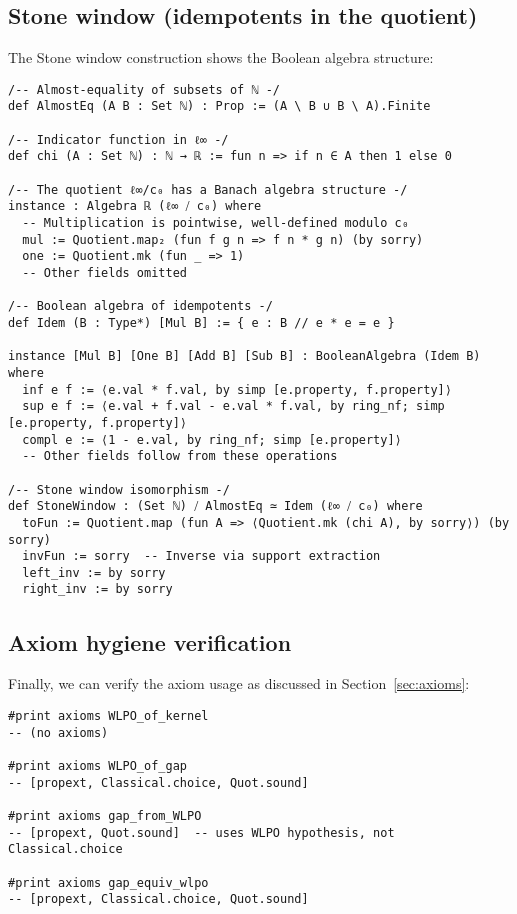 \documentclass[11pt]{article}
\begin{document}
\subsection{Stone window (idempotents in the quotient)}

The Stone window construction shows the Boolean algebra structure:

\begin{lstlisting}[caption={Stone window: Boolean algebra of idempotents},label={lst:stone}]
/-- Almost-equality of subsets of ℕ -/
def AlmostEq (A B : Set ℕ) : Prop := (A \ B ∪ B \ A).Finite

/-- Indicator function in ℓ∞ -/
def chi (A : Set ℕ) : ℕ → ℝ := fun n => if n ∈ A then 1 else 0

/-- The quotient ℓ∞/c₀ has a Banach algebra structure -/
instance : Algebra ℝ (ℓ∞ ⧸ c₀) where
  -- Multiplication is pointwise, well-defined modulo c₀
  mul := Quotient.map₂ (fun f g n => f n * g n) (by sorry)
  one := Quotient.mk (fun _ => 1)
  -- Other fields omitted

/-- Boolean algebra of idempotents -/
def Idem (B : Type*) [Mul B] := { e : B // e * e = e }

instance [Mul B] [One B] [Add B] [Sub B] : BooleanAlgebra (Idem B) where
  inf e f := ⟨e.val * f.val, by simp [e.property, f.property]⟩
  sup e f := ⟨e.val + f.val - e.val * f.val, by ring_nf; simp [e.property, f.property]⟩
  compl e := ⟨1 - e.val, by ring_nf; simp [e.property]⟩
  -- Other fields follow from these operations

/-- Stone window isomorphism -/
def StoneWindow : (Set ℕ) ⧸ AlmostEq ≃ Idem (ℓ∞ ⧸ c₀) where
  toFun := Quotient.map (fun A => ⟨Quotient.mk (chi A), by sorry⟩) (by sorry)
  invFun := sorry  -- Inverse via support extraction
  left_inv := by sorry
  right_inv := by sorry
\end{lstlisting}

\subsection{Axiom hygiene verification}

Finally, we can verify the axiom usage as discussed in Section~\ref{sec:axioms}:

\begin{lstlisting}[caption={Axiom audit commands},label={lst:axioms}]
#print axioms WLPO_of_kernel
-- (no axioms)

#print axioms WLPO_of_gap  
-- [propext, Classical.choice, Quot.sound]

#print axioms gap_from_WLPO
-- [propext, Quot.sound]  -- uses WLPO hypothesis, not Classical.choice

#print axioms gap_equiv_wlpo
-- [propext, Classical.choice, Quot.sound]
\end{lstlisting}
\end{document}
